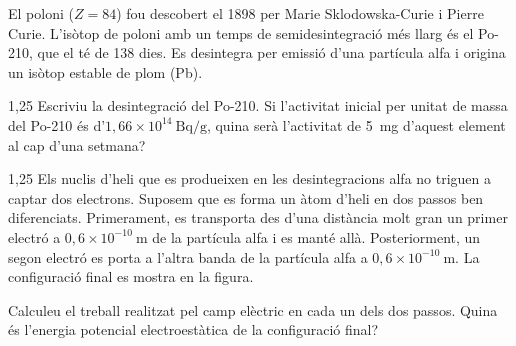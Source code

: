 El poloni ($Z = 84$) fou descobert el 1898 per Marie Sklodowska-Curie i Pierre Curie. L'isòtop de poloni amb un temps de semidesintegració més llarg és el Po-210, que el té de 138 dies. Es desintegra per emissió d'una partícula alfa i origina un isòtop estable de plom (Pb).

\begin{apartat}{1,25}
Escriviu la desintegració del Po-210. Si l'activitat inicial per unitat de massa del Po-210 és d'$1,66\times 10^{14}\ \mathrm{Bq/g}$, quina serà l'activitat de 5~mg d'aquest element al cap d'una setmana?
\end{apartat}

\begin{apartat}{1,25}
Els nuclis d'heli que es produeixen en les desintegracions alfa no triguen a captar dos electrons. Suposem que es forma un àtom d'heli en dos passos ben diferenciats. Primerament, es transporta des d'una distància molt gran un primer electró a $0,6\times 10^{-10}\ \mathrm{m}$ de la partícula alfa i es manté allà. Posteriorment, un segon electró es porta a l'altra banda de la partícula alfa a $0,6\times 10^{-10}\ \mathrm{m}$. La configuració final es mostra en la figura.


Calculeu el treball realitzat pel camp elèctric en cada un dels dos passos. Quina és l'energia potencial electroestàtica de la configuració final?
\end{apartat}

